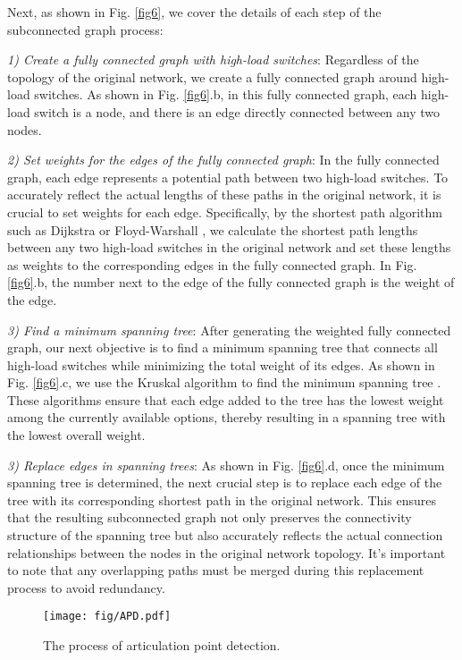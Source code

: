 \documentclass[journal]{IEEEtran}
\begin{document}
Next, as shown in Fig. \ref{fig6}, we cover the details of each step of the subconnected graph process:

\emph{1) Create a fully connected graph with high-load switches}:
Regardless of the topology of the original network, we create a fully connected graph around high-load switches. As shown in Fig. \ref{fig6}.b, in this fully connected graph, each high-load switch is a node, and there is an edge directly connected between any two nodes.

\emph{2) Set weights for the edges of the fully connected graph}:
In the fully connected graph, each edge represents a potential path between two high-load switches. To accurately reflect the actual lengths of these paths in the original network, it is crucial to set weights for each edge. Specifically, by the shortest path algorithm such as Dijkstra or Floyd-Warshall \cite{43}, we calculate the shortest path lengths between any two high-load switches in the original network and set these lengths as weights to the corresponding edges in the fully connected graph. In Fig. \ref{fig6}.b, the number next to the edge of the fully connected graph is the weight of the edge.

\emph{3) Find a minimum spanning tree}:
After generating the weighted fully connected graph, our next objective is to find a minimum spanning tree that connects all high-load switches while minimizing the total weight of its edges. As shown in Fig. \ref{fig6}.c, we use the Kruskal algorithm to find the minimum spanning tree \cite{45}. These algorithms ensure that each edge added to the tree has the lowest weight among the currently available options, thereby resulting in a spanning tree with the lowest overall weight. 

\emph{3) Replace edges in spanning trees}:
As shown in Fig. \ref{fig6}.d, once the minimum spanning tree is determined, the next crucial step is to replace each edge of the tree with its corresponding shortest path in the original network.   This ensures that the resulting subconnected graph not only preserves the connectivity structure of the spanning tree but also accurately reflects the actual connection relationships between the nodes in the original network topology.   It's important to note that any overlapping paths must be merged during this replacement process to avoid redundancy.

\begin{figure}[h]
\centering
\setlength{\abovecaptionskip}{0.cm}

\texttt{[image: fig/APD.pdf]}
\caption{The process of articulation point detection. }
\label{fig7}
\vspace{-0.1cm}
\end{figure}
\end{document}
